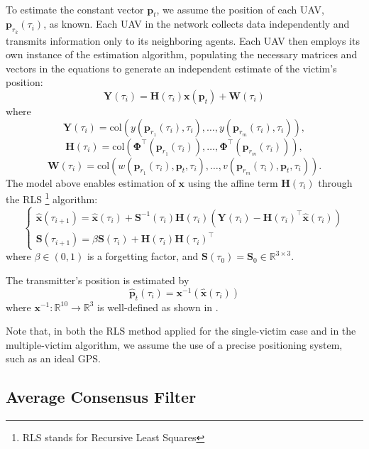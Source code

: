 \noindent
\\
To estimate the constant vector \( \mathbf{p}_t \), we assume the position of each 
UAV, \( \mathbf{p}_{r_k}(\tau_i) \), as known. 
Each UAV in the network collects data independently and transmits information only 
to its neighboring agents. Each UAV then employs its own instance of the estimation 
algorithm, populating the necessary matrices and vectors in the equations to 
generate an independent estimate of the victim’s position:
\[
\mathbf{Y}(\tau_i) = \mathbf{H}(\tau_i) \mathbf{x}(\mathbf{p}_t) + \mathbf{W}(\tau_i)
\]
where
\[
\mathbf{Y}(\tau_i) = \mathrm{col}(y(\mathbf{p}_{r_1}(\tau_i), \tau_i), \ldots, y(\mathbf{p}_{r_m}(\tau_i), \tau_i)),
\]
\[
\mathbf{H}(\tau_i) = \mathrm{col}(\mathbf{\Phi}^\top(\mathbf{p}_{r_1}(\tau_i)), \ldots, \mathbf{\Phi}^\top(\mathbf{p}_{r_m}(\tau_i))),
\]
\[
\mathbf{W}(\tau_i) = \mathrm{col}(w(\mathbf{p}_{r_1}(\tau_i),\mathbf{p}_t, \tau_i), \ldots, v(\mathbf{p}_{r_m}(\tau_i), \mathbf{p}_t, \tau_i)).
\]
The model above enables estimation of \( \mathbf{x} \) using the affine term 
\( \mathbf{H}(\tau_i) \) through the RLS \footnote{RLS stands for Recursive Least Squares} algorithm:
\[
\begin{cases}
    \hat{\mathbf{x}}(\tau_{i+1}) = \hat{\mathbf{x}}(\tau_i) + \mathbf{S}^{-1}(\tau_i)\mathbf{H}(\tau_i) \left( \mathbf{Y}(\tau_i) - \mathbf{H}(\tau_i)^\top \hat{\mathbf{x}}(\tau_i) \right) \\
    \mathbf{S}(\tau_{i+1}) = \beta \mathbf{S}(\tau_i) + \mathbf{H}(\tau_i)\mathbf{H}(\tau_i)^\top
\end{cases}
\]
where \( \beta \in (0, 1) \) is a forgetting factor, and \( \mathbf{S}(\tau_0) = \mathbf{S}_0 \in \mathbb{R}^{3 \times 3} \). 

\noindent
The transmitter's position is estimated by
\begin{equation}
    \hat{\mathbf{p}}_t(\tau_i) = \mathbf{x}^{-1}(\hat{\mathbf{x}}(\tau_i))
    \label{eq:mapping}
\end{equation}
where \( \mathbf{x}^{-1} : \mathbb{R}^{10} \rightarrow \mathbb{R}^3 \) is well-defined as shown in \cite{similar-main}. 

\noindent
Note that, in both the RLS method applied for the single-victim case and in the multiple-victim algorithm, 
we assume the use of a precise positioning system, such as an ideal GPS.

\subsection{Average Consensus Filter}

